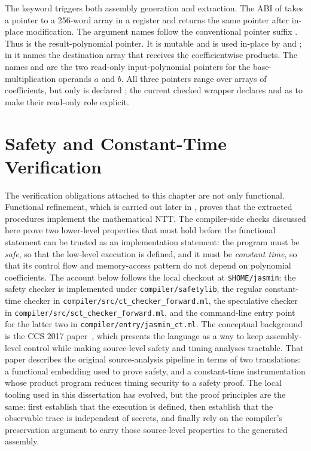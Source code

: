 The  keyword triggers both assembly generation and \easycrypt{}
extraction.  The ABI of  takes a pointer to a 256-word
array in a register and returns the same pointer after in-place modification.
The argument names follow the conventional pointer suffix .  Thus
 is the result-polynomial pointer.  It is mutable and is used in-place
by  and ; in
 it names the destination array that receives the
coefficientwise products.  The names  and  are the two
read-only input-polynomial pointers for the base-multiplication operands
\(a\) and \(b\).  All three pointers range over arrays of
 coefficients, but only  is declared ;
the current checked wrapper declares  and  as
 to make their read-only role explicit.

\section{Safety and Constant-Time Verification}

The \jasmin{} verification obligations attached to this chapter are not only
functional.  Functional refinement, which is carried out later in
\easycrypt{}, proves that the extracted procedures implement the mathematical
NTT.  The compiler-side checks discussed here prove two lower-level
properties that must hold before the functional statement can be trusted as an
implementation statement: the program must be \emph{safe}, so that the
low-level execution is defined, and it must be \emph{constant time}, so that
its control flow and memory-access pattern do not depend on polynomial
coefficients.  The account below follows the local \jasmin{} checkout at
\texttt{\$HOME/jasmin}: the safety checker is implemented under
\texttt{compiler/safetylib}, the regular constant-time checker in
\texttt{compiler/src/ct\_checker\_forward.ml}, the speculative checker in
\texttt{compiler/src/sct\_checker\_forward.ml}, and the command-line entry
point for the latter two in \texttt{compiler/entry/jasmin\_ct.ml}.
The conceptual background is the CCS 2017 \jasmin{} paper~\cite{Almeida2017},
which presents the language as a way to keep assembly-level control while
making source-level safety and timing analyses tractable.  That paper describes
the original source-analysis pipeline in terms of two translations: a
functional embedding used to prove safety, and a constant-time instrumentation
whose product program reduces timing security to a safety proof.  The local
tooling used in this dissertation has evolved, but the proof principles are the
same: first establish that the execution is defined, then establish that the
observable trace is independent of secrets, and finally rely on the
\jasmin{} compiler's preservation argument to carry those source-level
properties to the generated assembly.


